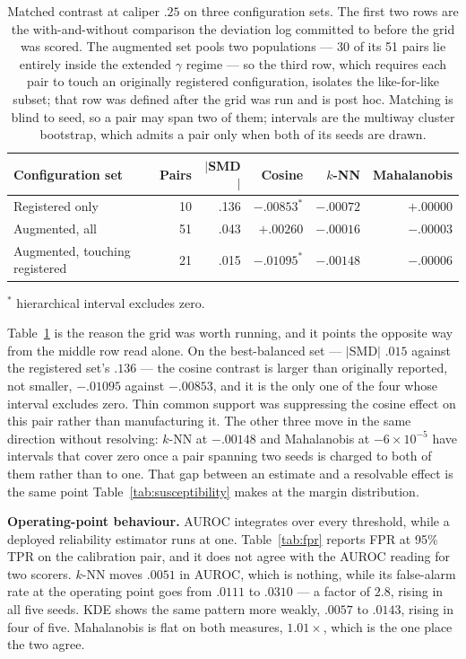 \documentclass[pdflatex,sn-basic]{sn-jnl}
\theoremstyle{plain}
\theoremstyle{definition}
\theoremstyle{remark}
\begin{document}
\begin{table}[t]
\centering
\caption{Matched contrast at caliper $.25$ on three configuration sets. The first two rows are the with-and-without comparison the deviation log committed to before the grid was scored. The augmented set pools two populations --- 30 of its 51 pairs lie entirely inside the extended $\gamma$ regime --- so the third row, which requires each pair to touch an originally registered configuration, isolates the like-for-like subset; that row was defined after the grid was run and is post hoc. Matching is blind to seed, so a pair may span two of them; intervals are the multiway cluster bootstrap, which admits a pair only when both of its seeds are drawn.}
\label{tab:support}
\small
\begin{tabular}{lrrrrr}
\toprule
Configuration set & Pairs & $|$SMD$|$ & Cosine & $k$-NN & Mahalanobis\\
\midrule
Registered only & 10 & .136 & $-.00853^\ast$ & $-.00072$ & $+.00000$\\
Augmented, all & 51 & .043 & $+.00260$ & $-.00016$ & $-.00003$\\
Augmented, touching registered & 21 & .015 & $-.01095^\ast$ & $-.00148$ & $-.00006$\\
\bottomrule
\end{tabular}
\par\vspace{2pt}
\footnotesize $^\ast$ hierarchical interval excludes zero.
\end{table}

Table~\ref{tab:support} is the reason the grid was worth running, and it points
the opposite way from the middle row read alone. On the best-balanced set ---
$|$SMD$|$ $.015$ against the registered set's $.136$ --- the cosine contrast is
larger than originally reported, not smaller, $-.01095$ against $-.00853$, and
it is the only one of the four whose interval excludes zero. Thin common support
was suppressing the cosine effect on this pair rather than manufacturing it. The
other three move in the same direction without resolving: $k$-NN at $-.00148$
and Mahalanobis at $-6\times10^{-5}$ have intervals that cover zero once a pair
spanning two seeds is charged to both of them rather than to one. That gap
between an estimate and a resolvable effect is the same point
Table~\ref{tab:susceptibility} makes at the margin distribution.

\textbf{Operating-point behaviour.} AUROC integrates over every threshold,
while a deployed reliability estimator runs at one. Table~\ref{tab:fpr} reports
FPR at 95\% TPR on the calibration pair, and it does not agree with the AUROC
reading for two scorers. $k$-NN moves $.0051$ in AUROC, which is nothing, while
its false-alarm rate at the operating point goes from $.0111$ to $.0310$ --- a
factor of $2.8$, rising in all five seeds. KDE shows the same pattern more
weakly, $.0057$ to $.0143$, rising in four of five. Mahalanobis is flat on both
measures, $1.01\times$, which is the one place the two agree.
\end{document}
